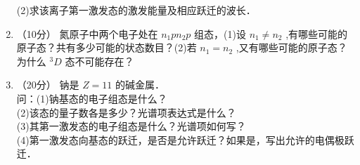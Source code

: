 \begin{enumerate}
(2)求该离子第一激发态的激发能量及相应跃迁的波长．
\item （10分）
氮原子中两个电子处在 $n_{1}pn_{2}p$ 组态，(1)设 $n_1\neq n_2$ ,有哪些可能的原子态？共有多少可能的状态数目？(2)若 $n_1=n_2$ ,又有哪些可能的原子态？为什么 $^{3}D$ 态不可能存在？
\item （20分） 
钠是 $Z=11$ 的碱金属．\\问：(1)钠基态的电子组态是什么？\\(2)该态的量子数各是多少？光谱项表达式是什么？\\(3)其第一激发态的电子组态是什么？光谱项如何写？\\(4)第一激发态向基态的跃迁，是否是允许跃迁？如果是，写出允许的电偶极跃迁．
\end{enumerate}